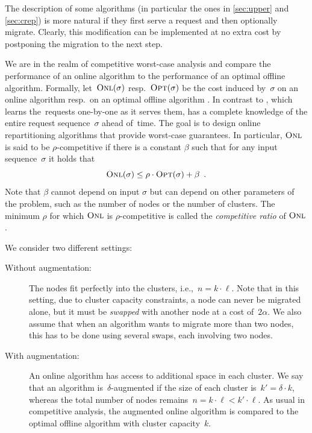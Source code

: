 The description of some algorithms (in particular the ones in \ref{sec:upper}
and \ref{sec:crep}) is more natural if they first serve a request and then
optionally migrate. Clearly, this modification can be implemented at no extra cost by
postponing the migration to the next step.

We are in the realm of competitive worst-case analysis and compare the
performance of an online algorithm to the performance of an optimal offline
algorithm. Formally, let~$\textsc{Onl}(\sigma)$ resp.~$\textsc{Opt}(\sigma)$ be the cost
induced by~$\sigma$ on an online algorithm \ONL resp.~on an optimal offline
algorithm \OPT. In contrast to \ONL, which learns the~requests one-by-one as
it serves them, \OPT has a complete knowledge of the entire request
sequence~$\sigma$ ahead of~time. The goal is to design online repartitioning
algorithms that provide worst-case guarantees. In particular, $\textsc{Onl}$ is said
to be $\rho$-competitive if there is a constant $\beta$ such that for any
input sequence~$\sigma$ it holds that
\[
	\textsc{Onl}(\sigma) \leq \rho \cdot \textsc{Opt}(\sigma) + \beta 
	\enspace.
\]
Note that $\beta$ cannot depend on input $\sigma$ but can depend on other
parameters of the problem, such as the number of nodes or the number of clusters.
The minimum $\rho$ for which $\textsc{Onl}$ is $\rho$-competitive is called the 
\emph{competitive ratio} of $\textsc{Onl}$. 

We consider two different settings:

\begin{description}

\item[Without augmentation:] The nodes fit perfectly into the clusters,
i.e.,~$n=k\cdot \ell$. Note that in this setting, due to cluster capacity
constraints, a node can never be migrated alone, but it must be \emph{swapped}
with another node at a cost of~$2\alpha$. We also assume that when an
algorithm wants to migrate more than two nodes, this has to be done using
several swaps, each involving two nodes.

\item[With augmentation:] An online algorithm has access to additional space
in each cluster. We say that an algorithm is~$\delta$-augmented if the size of
each cluster is~$k' = \delta \cdot k$, whereas the total number of nodes
remains~$n = k\cdot \ell < k'\cdot \ell$. As usual in competitive analysis,
the augmented online algorithm is compared to the optimal offline algorithm
with cluster capacity~$k$.
\end{description}



